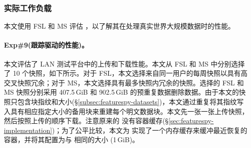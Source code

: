 \subsubsection{实际工作负载}
\label{subsec:featurespy-real}
本文使用 FSL 和 MS 评估 \prototype，以了解其在处理真实世界大规模数据时的性能。

\paragraph*{Exp\#9(跟踪驱动的性能)。}
本文评估了 LAN 测试平台中的上传和下载性能。本文从 FSL 和 MS 中分别选择了 10 个快照，如下所示。对于 FSL，本文选择来自同一用户的每周快照以具有高交叉快照冗余；对于 MS，本文选择具有最多快照内冗余的快照。选择的 FSL 和 MS 快照分别采用 407.5\,GiB 和 902.5\,GiB 的预重复数据删除数据。由于本文的快照只包含块指纹和大小(\S\ref{subsec:featurespy-datasets})，本文通过重复将其指纹写入具有相应指定大小的备用块来重建每个明文数据块。本文先一张一张上传快照，然后按照上传的顺序下载。注意原来的 \sysnameS \cite{ren21} 没有容器缓存(\S\ref{sec:featurespy-implementation})；为了公平比较，本文为 \sysnameS 实现了一个内存缓存来缓冲最近恢复的容器，并将其配置为与 \prototype 相同的大小 (1\,GiB)。


